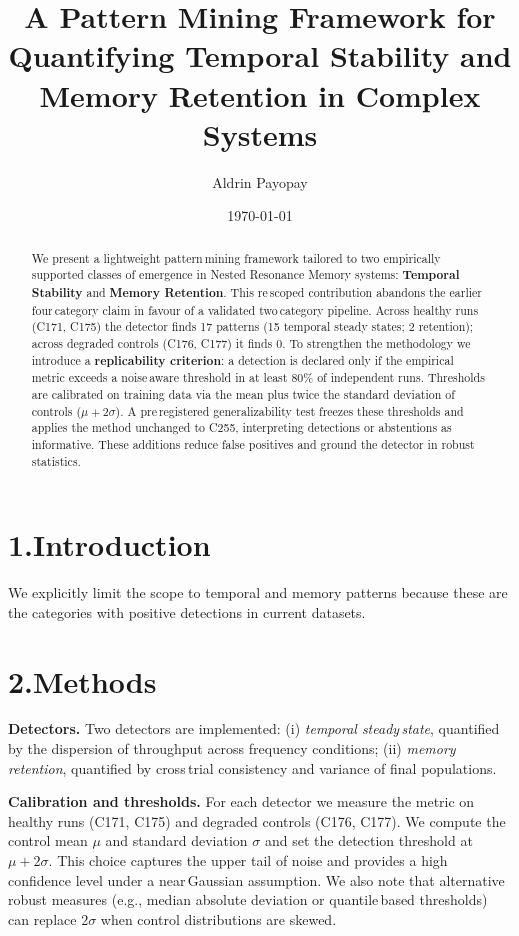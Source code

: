 \documentclass[11pt]{article}
\title{A Pattern Mining Framework for Quantifying Temporal Stability and Memory Retention in Complex Systems}
\author{Aldrin Payopay}
\date{\today}
\begin{document}
\maketitle

\begin{abstract}
We present a lightweight pattern\,mining framework tailored to two empirically supported classes of emergence in Nested Resonance Memory systems: \textbf{Temporal Stability} and \textbf{Memory Retention}.  This re\,scoped contribution abandons the earlier four\,category claim in favour of a validated two\,category pipeline.  Across healthy runs (C171, C175) the detector finds 17 patterns (15 temporal steady states; 2 retention); across degraded controls (C176, C177) it finds 0.  To strengthen the methodology we introduce a \textbf{replicability criterion}: a detection is declared only if the empirical metric exceeds a noise\,aware threshold in at least 80\% of independent runs.  Thresholds are calibrated on training data via the mean plus twice the standard deviation of controls (\(\mu + 2\sigma\)).  A pre\,registered generalizability test freezes these thresholds and applies the method unchanged to C255, interpreting detections or abstentions as informative.  These additions reduce false positives and ground the detector in robust statistics.
\end{abstract}

\section*{1.\quad Introduction}
We explicitly limit the scope to temporal and memory patterns because these are the categories with positive detections in current datasets.

\section*{2.\quad Methods}
\noindent\textbf{Detectors.}  Two detectors are implemented: (i) \emph{temporal steady\,state}, quantified by the dispersion of throughput across frequency conditions; (ii) \emph{memory retention}, quantified by cross\,trial consistency and variance of final populations.

\smallskip
\noindent\textbf{Calibration and thresholds.}  For each detector we measure the metric on healthy runs (C171, C175) and degraded controls (C176, C177).  We compute the control mean $\mu$ and standard deviation $\sigma$ and set the detection threshold at $\mu+2\sigma$.  This choice captures the upper tail of noise and provides a high confidence level under a near\,Gaussian assumption.  We also note that alternative robust measures (e.g., median absolute deviation or quantile\,based thresholds) can replace $2\sigma$ when control distributions are skewed.
\end{document}
